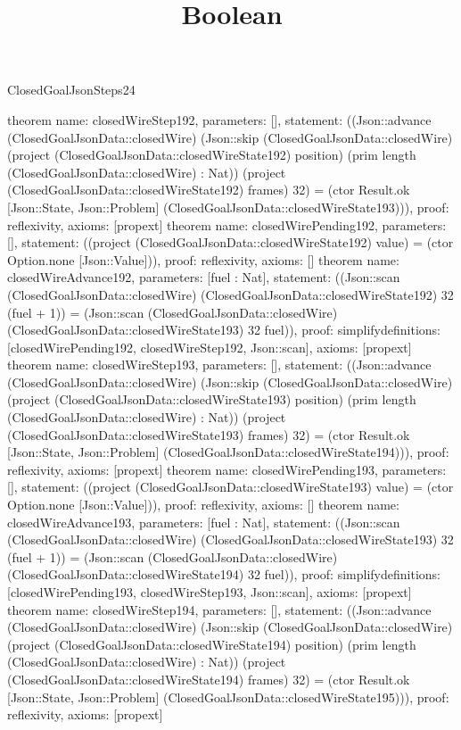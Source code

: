 \begin{lexlean}{ClosedGoalJsonSteps24}
\title{Boolean}
\begin{semanticmodule}
theorem{
 name: closedWireStep192, parameters: [],
 statement: ((Json::advance (ClosedGoalJsonData::closedWire) (Json::skip (ClosedGoalJsonData::closedWire) (project (ClosedGoalJsonData::closedWireState192) position) (prim length (ClosedGoalJsonData::closedWire) : Nat)) (project (ClosedGoalJsonData::closedWireState192) frames) 32) = (ctor Result.ok [Json::State, Json::Problem] (ClosedGoalJsonData::closedWireState193))), proof: reflexivity{}, axioms: [propext]
}
theorem{
 name: closedWirePending192, parameters: [],
 statement: ((project (ClosedGoalJsonData::closedWireState192) value) = (ctor Option.none [Json::Value])), proof: reflexivity{}, axioms: []
}
theorem{
 name: closedWireAdvance192, parameters: [fuel : Nat],
 statement: ((Json::scan (ClosedGoalJsonData::closedWire) (ClosedGoalJsonData::closedWireState192) 32 (fuel + 1)) = (Json::scan (ClosedGoalJsonData::closedWire) (ClosedGoalJsonData::closedWireState193) 32 fuel)), proof: simplify{definitions: [closedWirePending192, closedWireStep192, Json::scan]}, axioms: [propext]
}
theorem{
 name: closedWireStep193, parameters: [],
 statement: ((Json::advance (ClosedGoalJsonData::closedWire) (Json::skip (ClosedGoalJsonData::closedWire) (project (ClosedGoalJsonData::closedWireState193) position) (prim length (ClosedGoalJsonData::closedWire) : Nat)) (project (ClosedGoalJsonData::closedWireState193) frames) 32) = (ctor Result.ok [Json::State, Json::Problem] (ClosedGoalJsonData::closedWireState194))), proof: reflexivity{}, axioms: [propext]
}
theorem{
 name: closedWirePending193, parameters: [],
 statement: ((project (ClosedGoalJsonData::closedWireState193) value) = (ctor Option.none [Json::Value])), proof: reflexivity{}, axioms: []
}
theorem{
 name: closedWireAdvance193, parameters: [fuel : Nat],
 statement: ((Json::scan (ClosedGoalJsonData::closedWire) (ClosedGoalJsonData::closedWireState193) 32 (fuel + 1)) = (Json::scan (ClosedGoalJsonData::closedWire) (ClosedGoalJsonData::closedWireState194) 32 fuel)), proof: simplify{definitions: [closedWirePending193, closedWireStep193, Json::scan]}, axioms: [propext]
}
theorem{
 name: closedWireStep194, parameters: [],
 statement: ((Json::advance (ClosedGoalJsonData::closedWire) (Json::skip (ClosedGoalJsonData::closedWire) (project (ClosedGoalJsonData::closedWireState194) position) (prim length (ClosedGoalJsonData::closedWire) : Nat)) (project (ClosedGoalJsonData::closedWireState194) frames) 32) = (ctor Result.ok [Json::State, Json::Problem] (ClosedGoalJsonData::closedWireState195))), proof: reflexivity{}, axioms: [propext]
}
\end{semanticmodule}
\end{lexlean}
